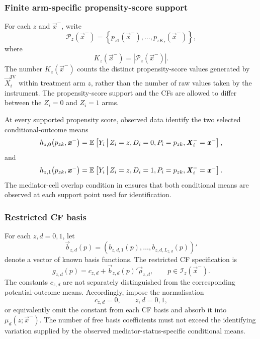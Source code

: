 \subsubsection{Finite arm-specific propensity-score support}

For each $z$ and $\vec x^-$, write
\[
    \mathcal P_z(\vec x^-)
    =
    \left\{
        p_{z1}(\vec x^-),
        \ldots,
        p_{zK_z}(\vec x^-)
    \right\},
\]
where
\[
    K_z(\vec x^-)
    =
    \left|
        \mathcal P_z(\vec x^-)
    \right|.
\]
The number $K_z(\vec x^-)$ counts the distinct propensity-score values generated by $\vec X_i^{\mathrm{IV}}$ within treatment arm $z$, rather than the number of raw values taken by the instrument.
The propensity-score support and the CFs are allowed to differ between the $Z_i=0$ and $Z_i=1$ arms.

At every supported propensity score, observed data identify the two selected conditional-outcome means
\[
    h_{z,0}
    \big(
        p_{zk},\boldsymbol{\mathit{x}}^-
    \big)
    =
    \mathbb{E}_{} \left[ 
        Y_i
     \, \middle\vert \, 
        Z_i=z,
        D_i=0,
        P_i=p_{zk},
        \boldsymbol{\mathit{X}}_i^-=\boldsymbol{\mathit{x}}^-
     \right],
\]
and
\[
    h_{z,1}
    \big(
        p_{zk},\boldsymbol{\mathit{x}}^-
    \big)
    =
    \mathbb{E}_{} \left[ 
        Y_i
     \, \middle\vert \, 
        Z_i=z,
        D_i=1,
        P_i=p_{zk},
        \boldsymbol{\mathit{X}}_i^-=\boldsymbol{\mathit{x}}^-
     \right].
\]
The mediator-cell overlap condition in  ensures that both conditional means are observed at each support point used for identification.

\subsubsection{Restricted CF basis}

For each $z,d=0,1$, let
\[
    \vec b_{z,d}(p)
    =
    \left(
        b_{z,d,1}(p),
        \ldots,
        b_{z,d,L_{z,d}}(p)
    \right)'
\]
denote a vector of known basis functions.
The restricted CF specification is
\[
    g_{z,d}(p)
    =
    c_{z,d}
    +
    \vec b_{z,d}(p)'
    \vec\rho_{z,d},
    \qquad
    p\in\mathcal I_z(\vec x^-).
    \label{eqn:restricted-cf-basis}
\]
The constants $c_{z,d}$ are not separately distinguished from the corresponding potential-outcome means.
Accordingly, impose the normalisation
\[
    c_{z,d}=0,
    \qquad
    z,d=0,1,
\]
or equivalently omit the constant from each CF basis and absorb it into $\mu_d(z;\vec x^-)$.
The number of free basis coefficients must not exceed the identifying variation supplied by the observed mediator-status-specific conditional means.

